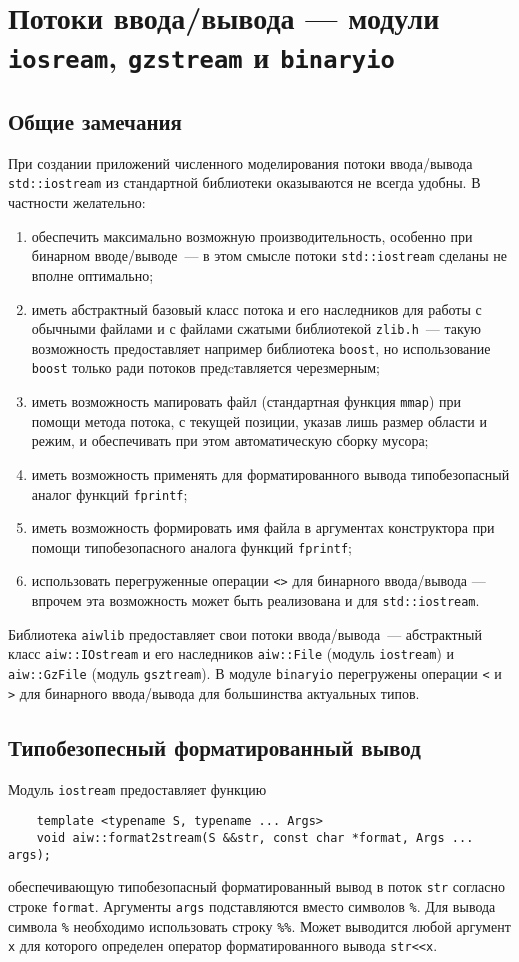 \section{Потоки ввода/вывода --- модули {\tt iosream}, {\tt gzstream} и {\tt binaryio}}
\subsection{Общие замечания}
При создании приложений численного моделирования потоки ввода/вывода \verb'std::iostream'
из стандартной библиотеки оказываются не всегда удобны. В частности желательно:
\begin{enumerate}
\item обеспечить максимально возможную производительность, особенно при бинарном вводе/выводе~---
  в этом смысле потоки \verb'std::iostream' сделаны не вполне оптимально;
\item иметь абстрактный базовый класс потока и его наследников для работы с обычными файлами и с файлами сжатыми
  библиотекой \verb'zlib.h'~--- такую возможность предоставляет например библиотека
  \verb'boost', но использование \verb'boost' только ради потоков предcтавляется черезмерным;
\item иметь возможность мапировать файл (стандартная функция \verb'mmap') при помощи метода потока,
  с текущей позиции, указав лишь размер области и режим, и обеспечивать при этом автоматическую сборку мусора;
\item иметь возможность применять для форматированного вывода типобезопасный аналог функций \verb'fprintf';
\item иметь возможность формировать имя файла в аргументах конструктора при помощи типобезопасного аналога функций \verb'fprintf';
\item использовать перегруженные операции {\tt <>} для бинарного ввода/вывода --- 
впрочем эта возможность может быть реализована и для \verb'std::iostream'.
\end{enumerate}
Библиотека \verb'aiwlib' предоставляет свои потоки ввода/вывода~--- абстрактный класс \verb'aiw::IOstream'
и его наследников \verb'aiw::File' (модуль \verb'iostream') и \verb'aiw::GzFile' (модуль \verb'gsztream'). В модуле \verb'binaryio'
перегружены операции \verb'<' и \verb'>' для бинарного ввода/вывода для большинства актуальных типов.

\subsection{Типобезопесный форматированный вывод}
Модуль \verb'iostream' предоставляет функцию
\begin{verbatim}
    template <typename S, typename ... Args>
    void aiw::format2stream(S &&str, const char *format, Args ... args);
\end{verbatim}
обеспечивающую типобезопасный форматированный вывод в поток \verb'str' согласно строке \verb'format'.
Аргументы \verb'args' подставляются вместо символов \verb'%'.
Для вывода символа \verb'%' необходимо использовать строку \verb'%%'.
Может выводится любой аргумент \verb'x' для которого определен оператор
форматированного вывода \verb'str<<x'.

